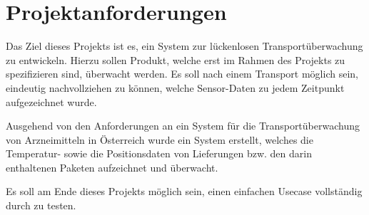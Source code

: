 \section{Projektanforderungen}
\label{sec:requirements}

Das Ziel dieses Projekts ist es, ein System zur lückenlosen Transportüberwachung
	zu entwickeln. Hierzu sollen Produkt, welche erst im Rahmen des Projekts zu
	spezifizieren sind, überwacht werden. Es soll nach einem Transport möglich
	sein, eindeutig nachvollziehen zu können, welche Sensor-Daten zu jedem
	Zeitpunkt aufgezeichnet wurde.

Ausgehend von den Anforderungen an ein System für die Transportüberwachung von
	Arzneimitteln in Österreich \cite{PHARMIG07} wurde ein System erstellt,
	welches die Temperatur- sowie die Positionsdaten von Lieferungen bzw.
	den darin enthaltenen Paketen aufzeichnet und überwacht.
	
Es soll am Ende dieses Projekts möglich sein, einen einfachen Usecase vollständig
	durch zu testen.